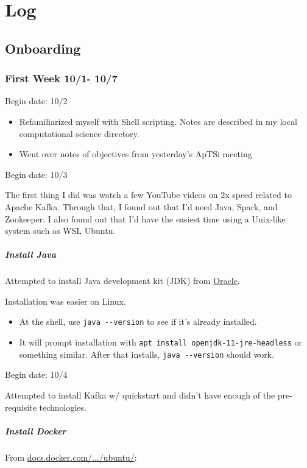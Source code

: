 \part{Log}

\chapter{Onboarding}

\section*{First Week 10/1- 10/7}
Begin date: 10/2

\begin{itemize}
\item Refamiliarized myself with Shell scripting. Notes are described in my local computational science directory.
\item Went over notes of objectives from yesterday's ApTSi meeting
\end{itemize}


Begin date: 10/3

The first thing I did was watch a few YouTube videos on 2x speed related to Apache Kafka. Through that, I found out that I'd need Java, Spark, and Zookeeper. I also found out that I'd have the easiest time using a Unix-like system such as WSL Ubuntu.

\subsubsection*{Install Java}
Attempted to install Java development kit (JDK) from \href{https://www.oracle.com/java/technologies/javase-jdk11-downloads.html}{Oracle}.

Installation was easier on Linux.
\begin{itemize}
\item At the shell, use \verb|java --version| to see if it's already installed.
\item It will prompt installation with \verb+apt install openjdk-11-jre-headless+ or something similar. After that installs, \verb|java --version| should work.
\end{itemize}


Begin date: 10/4

Attempted to install Kafka w/ quickstart and didn't have enough of the pre-requisite technologies.

\subsubsection*{Install Docker}
From \href{https://docs.docker.com/engine/install/ubuntu/}{docs.docker.com/.../ubuntu/}:

